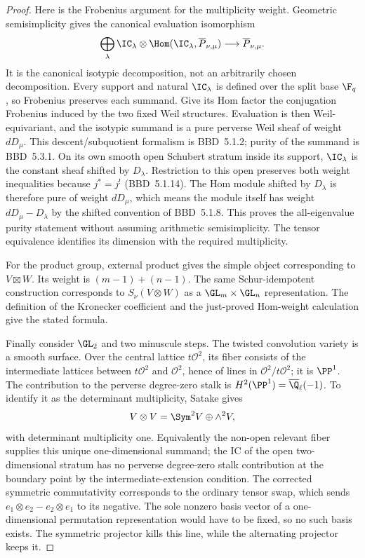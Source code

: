 \begin{proof}
Here is the Frobenius argument for the multiplicity weight. Geometric semisimplicity gives the canonical evaluation isomorphism
\[
 \bigoplus_\lambda\IC_\lambda\otimes
 \Hom(\IC_\lambda,\overline P_{\nu,\mu})
 \longrightarrow\overline P_{\nu,\mu}.
\]
It is the canonical isotypic decomposition, not an arbitrarily chosen decomposition. Every support and natural $\IC_\lambda$ is defined over the split base $\F_q$, so Frobenius preserves each summand. Give its Hom factor the conjugation Frobenius induced by the two fixed Weil structures. Evaluation is then Weil-equivariant, and the isotypic summand is a pure perverse Weil sheaf of weight $dD_\mu$. This descent/subquotient formalism is BBD~5.1.2; purity of the summand is BBD~5.3.1. On its own smooth open Schubert stratum inside its support, $\IC_\lambda$ is the constant sheaf shifted by $D_\lambda$. Restriction to this open preserves both weight inequalities because $j^*=j^!$ (BBD~5.1.14). The Hom module shifted by $D_\lambda$ is therefore pure of weight $dD_\mu$, which means the module itself has weight $dD_\mu-D_\lambda$ by the shifted convention of BBD~5.1.8. This proves the all-eigenvalue purity statement without assuming arithmetic semisimplicity. The tensor equivalence identifies its dimension with the required multiplicity.

For the product group, external product gives the simple object corresponding to $V\boxtimes W$. Its weight is $(m-1)+(n-1)$. The same Schur-idempotent construction corresponds to $S_\nu(V\otimes W)$ as a $\GL_m\times\GL_n$ representation. The definition of the Kronecker coefficient and the just-proved Hom-weight calculation give the stated formula.

Finally consider $\GL_2$ and two minuscule steps. The twisted convolution variety is a smooth surface. Over the central lattice $t\mathcal O^2$, its fiber consists of the intermediate lattices between $t\mathcal O^2$ and $\mathcal O^2$, hence of lines in $\mathcal O^2/t\mathcal O^2$; it is $\PP^1$. The contribution to the perverse degree-zero stalk is $H^2(\PP^1)=\overline\Q_\ell(-1)$. To identify it as the determinant multiplicity, Satake gives
\[
 V\otimes V=\Sym^2V\oplus\wedge^2V,
\]
with determinant multiplicity one. Equivalently the non-open relevant fiber supplies this unique one-dimensional summand; the IC of the open two-dimensional stratum has no perverse degree-zero stalk contribution at the boundary point by the intermediate-extension condition. The corrected symmetric commutativity corresponds to the ordinary tensor swap, which sends
$e_1\otimes e_2-e_2\otimes e_1$ to its negative. The sole nonzero basis vector of a one-dimensional permutation representation would have to be fixed, so no such basis exists. The symmetric projector kills this line, while the alternating projector keeps it.
\end{proof}
